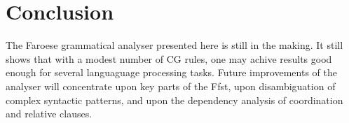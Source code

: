 \documentclass[a4paper,english]{article}
\begin{document}
 
\section{Conclusion}

The Faroese grammatical analyser presented here is still in the making. It still shows that with a modest number of CG rules, one may achive results good enough for several languaguage processing tasks. Future improvements of the analyser will concentrate upon key parts of the Ffst, upon disambiguation of complex syntactic patterns, and upon the dependency analysis of coordination and relative clauses.

	
\end{document}
